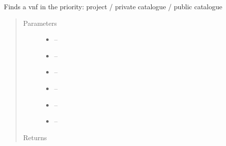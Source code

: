\documentclass[letterpaper,10pt,english]{sphinxmanual}
\begin{document}
\begin{fulllineitems}
\label{_source/son_editor.impl:son_editor.impl.nsfslookupimpl.find_vnf}
Finds a vnf in the priority: project / private catalogue / public catalogue
\begin{quote}\begin{description}
\item[{Parameters}] \leavevmode\begin{itemize}
\item {} 
 -- 

\item {} 
 -- 

\item {} 
 -- 

\item {} 
 -- 

\item {} 
 -- 

\item {} 
 -- 

\end{itemize}

\item[{Returns}] \leavevmode


\end{description}\end{quote}

\end{fulllineitems}

\end{document}
